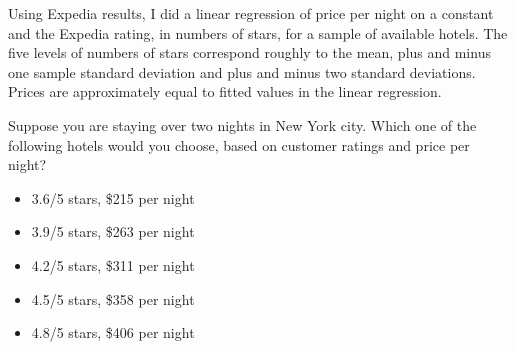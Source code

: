 
Using Expedia results, I did a linear regression of price per night on a constant and the Expedia rating, in numbers of stars, for a sample of available hotels.
The five levels of numbers of stars correspond roughly to the mean, plus and minus one sample standard deviation and plus and minus two standard deviations.
Prices are approximately equal to fitted values in the linear regression.

\begin{tcolorbox}
Suppose you are staying over two nights in New York city.
Which one of the following hotels would you choose, based on customer ratings and price per night?	

\begin{itemize}
	\setlength\itemsep{-5pt}
	\item 3.6/5 stars, \$215 per night
	\item 3.9/5 stars, \$263 per night
	\item 4.2/5 stars, \$311 per night
	\item 4.5/5 stars, \$358 per night
	\item 4.8/5 stars, \$406 per night
\end{itemize}
\end{tcolorbox}
